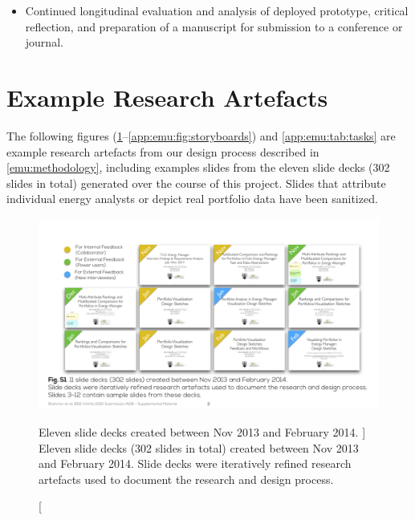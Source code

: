 
\begin{itemize}
    \item Continued longitudinal evaluation and analysis of deployed prototype, critical reflection, and preparation of a manuscript for submission to a conference or journal.
\end{itemize}


\section{Example Research Artefacts}
\label{app:emu:examples}


The following figures (\ref{app:emu:fig:slide-decks}--\ref{app:emu:fig:storyboards}) and \autoref{app:emu:tab:tasks} are example research artefacts from our design process described in \autoref{emu:methodology}, including examples slides from the eleven slide decks (302 slides in total) generated over the course of this project. 
Slides that attribute individual energy analysts or depict real portfolio data have been sanitized.


\begin{figure}
	\centering
	\includegraphics[width=\textwidth]{figures/s-emu-02.pdf}
	\caption
	[
	    Eleven slide decks created between Nov 2013 and February 2014.
	]
	{
    	Eleven slide decks (302 slides in total) created between Nov 2013 and February 2014. Slide decks were iteratively refined research artefacts used to document the research and design process.
	}
	\centering
	\label{app:emu:fig:slide-decks}
\end{figure}

